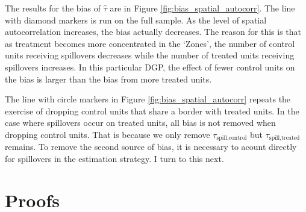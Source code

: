 \documentclass[11pt]{article}
\begin{document}
The results for the bias of $\hat{\tau}$ are in Figure \ref{fig:bias_spatial_autocorr}. The line with diamond markers is run on the full sample. As the level of spatial autocorrelation increases, the bias actually decreases. The reason for this is that as treatment becomes more concentrated in the `Zones', the number of control units receiving spillovers decreases while the number of treated units receiving spillovers increases. In this particular DGP, the effect of fewer control units on the bias is larger than the bias from more treated units. 

The line with circle markers in Figure \ref{fig:bias_spatial_autocorr} repeats the exercise of dropping control units that share a border with treated units. In the case where spillovers occur on treated units, all bias is not removed when dropping control units. That is because we only remove $\tau_{\text{spill,control}}$ but $\tau_{\text{spill,treated}}$ remains. To remove the second source of bias, it is necessary to acount directly for spillovers in the estimation strategy. I turn to this next. 






















\newpage \printbibliography


\newpage \appendix 
\renewcommand{\thetable}{\Alph{section}.\arabic{table}}

\section{Proofs}
\end{document}
